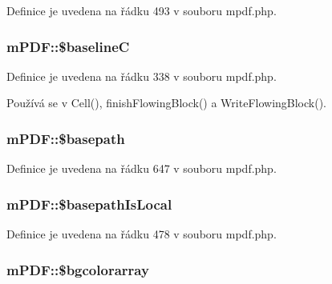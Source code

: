 Definice je uvedena na řádku 493 v souboru mpdf.\-php.

\hypertarget{classm_p_d_f_a12df8de980644c15035ed39e3a30dd90}{
\subsubsection[{\$baseline\-C}]{\setlength{\rightskip}{0pt plus 5cm}m\-P\-D\-F\-::\$baseline\-C}}\label{classm_p_d_f_a12df8de980644c15035ed39e3a30dd90}


Definice je uvedena na řádku 338 v souboru mpdf.\-php.



Používá se v Cell(), finish\-Flowing\-Block() a Write\-Flowing\-Block().

\hypertarget{classm_p_d_f_a1f5531ab58aaca68a634d54638edd76f}{
\subsubsection[{\$basepath}]{\setlength{\rightskip}{0pt plus 5cm}m\-P\-D\-F\-::\$basepath}}\label{classm_p_d_f_a1f5531ab58aaca68a634d54638edd76f}


Definice je uvedena na řádku 647 v souboru mpdf.\-php.

\hypertarget{classm_p_d_f_a5f7b1214aa0ade877727f615be30b07a}{
\subsubsection[{\$basepath\-Is\-Local}]{\setlength{\rightskip}{0pt plus 5cm}m\-P\-D\-F\-::\$basepath\-Is\-Local}}\label{classm_p_d_f_a5f7b1214aa0ade877727f615be30b07a}


Definice je uvedena na řádku 478 v souboru mpdf.\-php.

\hypertarget{classm_p_d_f_aef1d1b23b5db547804d110f1d3207e02}{
\subsubsection[{\$bgcolorarray}]{\setlength{\rightskip}{0pt plus 5cm}m\-P\-D\-F\-::\$bgcolorarray}}\label{classm_p_d_f_aef1d1b23b5db547804d110f1d3207e02}


